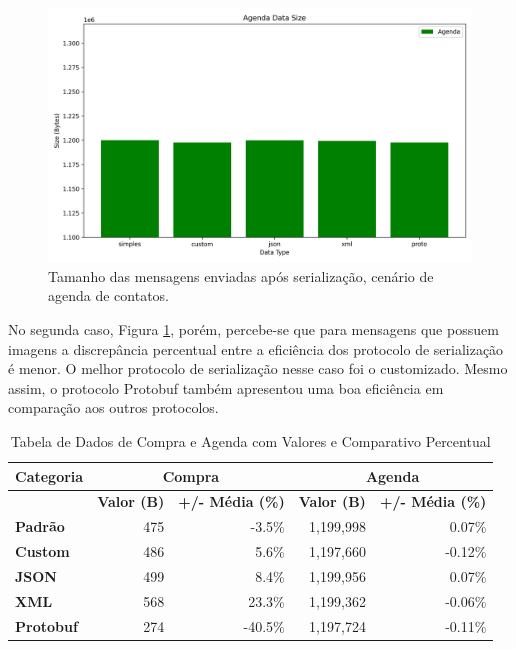 \documentclass{article}
\begin{document}
\begin{figure}[H]
    \centering
    \includegraphics[width=\textwidth]{imgs/agenda_data_size.png}
    \caption{Tamanho das mensagens enviadas após serialização, cenário de agenda de contatos.}
    \label{fig:agenda}
\end{figure}

No segunda caso, Figura \ref{fig:agenda}, porém, percebe-se que para mensagens que possuem imagens a discrepância percentual entre a eficiência dos protocolo de serialização é menor. O melhor protocolo de serialização nesse caso foi o customizado. Mesmo assim, o protocolo Protobuf também apresentou uma boa eficiência em comparação aos outros protocolos.

\begin{table}[ht]
    \centering
    \begin{tabular}{l|r|r|r|r}
    \hline
    \textbf{Categoria} & \multicolumn{2}{c|}{\textbf{Compra}} & \multicolumn{2}{c|}{\textbf{Agenda}} \\
    \hline
    & \textbf{Valor (B)} & \textbf{+/- Média (\%)} & \textbf{Valor (B)} & \textbf{+/- Média (\%)} \\
    \hline
    \textbf{Padrão}   & 475   & -3.5\%  & 1,199,998  & 0.07\%  \\
    \textbf{Custom}   & 486   & 5.6\%   & 1,197,660  & -0.12\% \\
    \textbf{JSON}     & 499   & 8.4\%   & 1,199,956  & 0.07\%  \\
    \textbf{XML}      & 568   & 23.3\%  & 1,199,362  & -0.06\% \\
    \textbf{Protobuf} & 274   & -40.5\% & 1,197,724  & -0.11\% \\
    \hline
    \end{tabular}
    \caption{Tabela de Dados de Compra e Agenda com Valores e Comparativo Percentual}
    \label{tabela}
\end{table}
\end{document}
